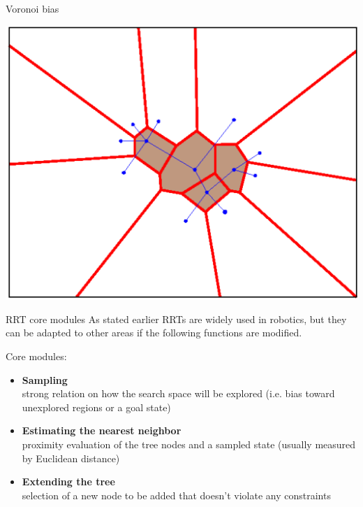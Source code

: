 \documentclass[10pt, xcolor=table]{beamer}
\begin{document}
\begin{frame}{Voronoi bias}
\begin{center}
\includegraphics[scale=0.4]{voronoi.png} 
\end{center}
\end{frame}

\begin{frame}{RRT core modules}
\justify
As stated earlier RRTs are widely used in robotics, but they can be adapted to other areas if the following functions are modified.
\begin{alertblock}{Core modules:}
\begin{itemize}
\item \textbf{Sampling} \\ 
strong relation on how the search space will be explored (i.e. bias toward unexplored regions or a goal state)
\item \textbf{Estimating the nearest neighbor} \\
proximity evaluation of the tree nodes and a sampled state (usually measured by Euclidean distance)
\item \textbf{Extending the tree} \\
selection of a new node to be added that doesn't violate any constraints 
\end{itemize}
\end{alertblock}
\end{frame}
\end{document}
